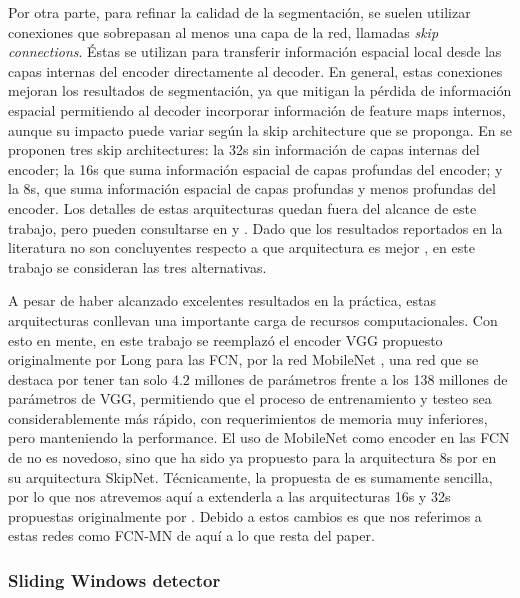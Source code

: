 \documentclass[a4paper,authoryear,review]{elsarticle}
\begin{document}
Por otra parte, para refinar la calidad de la segmentación, se suelen utilizar conexiones que sobrepasan al menos una capa de la red, llamadas \emph{skip connections}. Éstas se utilizan para transferir información espacial local desde las capas internas del encoder directamente al decoder. En general, estas conexiones mejoran los resultados de segmentación, ya que mitigan la pérdida de información espacial permitiendo al decoder incorporar información de feature maps internos, aunque su impacto puede variar según la skip architecture que se proponga. En \citet{long2015fully} se proponen tres skip architectures: la 32s sin información de capas internas del encoder; la 16s que suma información espacial de capas profundas del encoder; y la 8s, que suma información espacial de capas profundas y menos profundas del encoder. Los detalles de estas arquitecturas quedan fuera del alcance de este trabajo, pero pueden consultarse en \citet{long2015fully} y \cite{shelhamer2017fully}. Dado que los resultados reportados en la literatura no son concluyentes respecto a que arquitectura es mejor \cite{long2015fully, shelhamer2017fully}, en este trabajo se consideran las tres alternativas.

A pesar de haber alcanzado excelentes resultados en la práctica,  estas arquitecturas conllevan una importante carga de recursos computacionales. Con esto en mente, en este trabajo se reemplazó el encoder VGG \cite{Simonyan2015VeryDC} propuesto originalmente por Long para las FCN, por la red MobileNet \cite{howard2017mobilenets}, una red que se destaca por tener tan solo $4.2$ millones de parámetros frente a los 138 millones de parámetros de VGG, permitiendo que el proceso de entrenamiento y testeo sea considerablemente más rápido, con requerimientos de memoria muy inferiores, pero manteniendo la performance. El uso de MobileNet como encoder en las FCN de \citet{long2015fully} no es novedoso, sino que ha sido ya propuesto para la arquitectura 8s por \citet{siam2018rtseg} en su arquitectura SkipNet. Técnicamente, la propuesta de \citet{siam2018rtseg} es sumamente sencilla, por lo que nos atrevemos aquí a extenderla a las arquitecturas 16s y 32s propuestas originalmente por \citep{long2015fully}. Debido a estos cambios es que nos referimos a estas redes como FCN-MN de aquí a lo que resta del paper.


\subsubsection{Sliding Windows detector}
\label{sec:sw}
\end{document}
